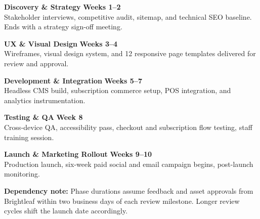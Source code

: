 \documentclass[11pt]{article}
\begin{document}
\begin{timeline}
  \item \textbf{\color{accent}Discovery \& Strategy} \hfill {\color{accent2}\textbf{Weeks 1--2}}\\[2pt]
        \small\color{softgray} Stakeholder interviews, competitive audit, sitemap, and technical
        SEO baseline. Ends with a strategy sign-off meeting.

  \item \textbf{\color{accent}UX \& Visual Design} \hfill {\color{accent2}\textbf{Weeks 3--4}}\\[2pt]
        \small\color{softgray} Wireframes, visual design system, and 12 responsive page templates
        delivered for review and approval.

  \item \textbf{\color{accent}Development \& Integration} \hfill {\color{accent2}\textbf{Weeks 5--7}}\\[2pt]
        \small\color{softgray} Headless CMS build, subscription commerce setup, POS integration,
        and analytics instrumentation.

  \item \textbf{\color{accent}Testing \& QA} \hfill {\color{accent2}\textbf{Week 8}}\\[2pt]
        \small\color{softgray} Cross-device QA, accessibility pass, checkout and subscription flow
        testing, staff training session.

  \item \textbf{\color{accent}Launch \& Marketing Rollout} \hfill {\color{accent2}\textbf{Weeks 9--10}}\\[2pt]
        \small\color{softgray} Production launch, six-week paid social and email campaign begins,
        post-launch monitoring.
\end{timeline}

\vspace{0.8em}
\begin{tcolorbox}[noteboxstyle]
  \textbf{\color{accent}Dependency note:} Phase durations assume feedback and asset approvals
  from Brightleaf within two business days of each review milestone. Longer review cycles shift
  the launch date accordingly.
\end{tcolorbox}

\clearpage

\end{document}
